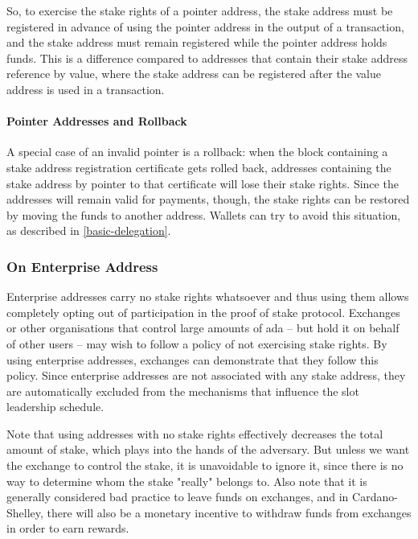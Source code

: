 \documentclass[11pt,a4paper,dvipsnames,twosided]{article}
\begin{document}
So, to exercise the stake rights of a pointer address, the stake address must be
registered in advance of using the pointer address in the output of a
transaction, and the stake address must remain registered while the pointer
address holds funds. This is a difference compared to addresses that contain
their stake address reference by value, where the stake address can be registered
after the value address is used in a transaction.

\paragraph{Pointer Addresses and Rollback}
A special case of an invalid pointer is a rollback: when the block containing a
stake address registration certificate gets rolled back, addresses containing
the stake address by pointer to that certificate will lose their stake rights.
Since the addresses will remain valid for payments, though, the stake rights can
be restored by moving the funds to another address. Wallets can try to avoid
this situation, as described in \cref{basic-delegation}.

\subsubsection{On Enterprise Address}
\label{enterprise-address}

Enterprise addresses carry no stake rights whatsoever and thus using
them allows completely opting out of participation in the proof of stake
protocol. Exchanges or other organisations that control large amounts of
ada -- but hold it on behalf of other users -- may wish to follow a
policy of not exercising stake rights. By using enterprise addresses,
exchanges can demonstrate that they follow this policy.
Since enterprise addresses are not associated with any stake address, they
are automatically excluded from the mechanisms that influence the slot
leadership schedule.

Note that using addresses with no stake rights effectively decreases
the total amount of stake, which plays into the hands of the adversary.
But unless we want the exchange to control the stake, it is unavoidable to
ignore it, since there is no way to determine whom the stake "really" belongs
to. Also note that it is generally considered bad practice to leave funds on
exchanges, and in Cardano-Shelley, there will also be a monetary incentive to
withdraw funds from exchanges in order to earn rewards.
\end{document}
